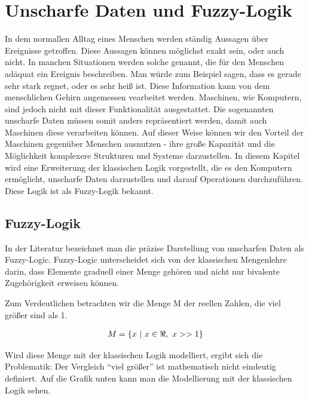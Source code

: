 \chapter{Unscharfe Daten und Fuzzy-Logik}
In dem normallen Alltag eines Menschen werden ständig Aussagen über Ereignisse getroffen. Diese Aussagen können möglichst exakt sein, oder auch nicht. In manchen Situationen werden solche genannt, die für den Menschen adäquat ein Ereignis beschreiben. Man würde zum Beispiel sagen, dass es gerade sehr stark regnet, oder es sehr heiß ist. Diese Information kann von dem menschlichen Gehirn angemessen vearbeitet werden. Maschinen, wie Komputern, sind jedoch nicht mit dieser Funktionalität ausgestattet. Die sogenannten unscharfe Daten müssen somit anders repräsentiert werden, damit auch Maschinen diese verarbeiten können. Auf dieser Weise können wir den Vorteil der Maschinen gegenüber Menschen ausnutzen - ihre große Kapazität und die Möglichkeit komplexere Strukturen und Systeme darzustellen. In diesem Kapitel wird eine Erweiterung der klassischen Logik vorgestellt, die es den Komputern ermöglicht, unscharfe Daten darzustellen und darauf Operationen durchzuführen. Diese Logik ist als Fuzzy-Logik bekannt.

\section{Fuzzy-Logik}


In der Literatur bezeichnet man die präzise Darstellung von unscharfen Daten als Fuzzy-Logic. Fuzzy-Logic unterscheidet sich von der klassischen Mengenlehre darin, dass Elemente graduell einer Menge gehören und nicht nur bivalente Zugehörigkeit erweisen können.

Zum Verdeutlichen betrachten wir die Menge M der reellen Zahlen, die viel größer sind als 1. 

\begin{align}
\centering
	M = \{ x \ |\ x \in \Re,\ x >> 1\}
\end{align}

Wird diese Menge mit der klassischen Logik modelliert, ergibt sich die Problematik: Der Vergleich ``viel größer'' ist mathematisch nicht eindeutig definiert. Auf die Grafik unten kann man die Modellierung mit der klassischen Logik sehen.

